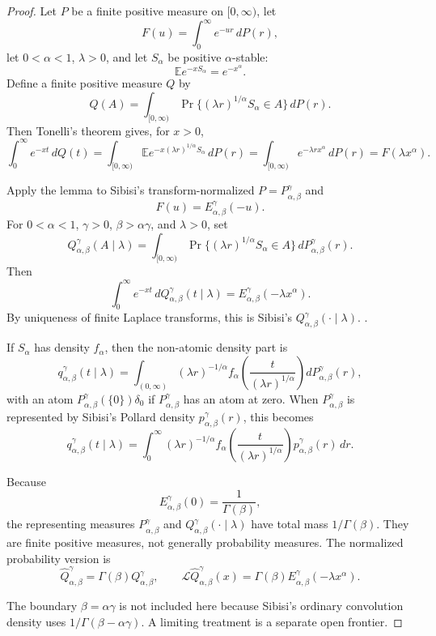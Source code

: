 \begin{proof}
Let \(P\) be a finite positive measure on \([0,\infty)\), let
\[
F(u)=\int_0^\infty e^{-ur}\,dP(r),
\]
let \(0<\alpha<1\), \(\lambda>0\), and let \(S_\alpha\) be positive \(\alpha\)-stable:
\[
\mathbb E e^{-xS_\alpha}=e^{-x^\alpha}.
\]
Define a finite positive measure \(Q\) by
\[
Q(A)=\int_{[0,\infty)}
\Pr\{(\lambda r)^{1/\alpha}S_\alpha\in A\}\,dP(r).
\]
Then Tonelli's theorem gives, for \(x>0\),
\[
\int_0^\infty e^{-xt}\,dQ(t)
=\int_{[0,\infty)}
\mathbb E e^{-x(\lambda r)^{1/\alpha}S_\alpha}\,dP(r)
=\int_{[0,\infty)}e^{-\lambda r x^\alpha}\,dP(r)
=F(\lambda x^\alpha).
\]

Apply the lemma to Sibisi's transform-normalized \(P=P^\gamma_{\alpha,\beta}\) and
\[
F(u)=E^\gamma_{\alpha,\beta}(-u).
\]
For \(0<\alpha<1\), \(\gamma>0\), \(\beta>\alpha\gamma\), and \(\lambda>0\), set
\[
Q^\gamma_{\alpha,\beta}(A\mid\lambda)
=\int_{[0,\infty)}
\Pr\{(\lambda r)^{1/\alpha}S_\alpha\in A\}\,
dP^\gamma_{\alpha,\beta}(r).
\]
Then
\[
\int_0^\infty e^{-xt}\,dQ^\gamma_{\alpha,\beta}(t\mid\lambda)
=E^\gamma_{\alpha,\beta}(-\lambda x^\alpha).
\]
By uniqueness of finite Laplace transforms, this is Sibisi's \(Q^\gamma_{\alpha,\beta}(\cdot\mid\lambda)\). \cite{sibisi-prabhakar}.

If \(S_\alpha\) has density \(f_\alpha\), then the non-atomic density part is
\[
q^\gamma_{\alpha,\beta}(t\mid\lambda)
=\int_{(0,\infty)}
(\lambda r)^{-1/\alpha}
f_\alpha\!\left(\frac{t}{(\lambda r)^{1/\alpha}}\right)
dP^\gamma_{\alpha,\beta}(r),
\]
with an atom \(P^\gamma_{\alpha,\beta}(\{0\})\delta_0\) if \(P^\gamma_{\alpha,\beta}\) has an atom at zero. When \(P^\gamma_{\alpha,\beta}\) is represented by Sibisi's Pollard density \(p^\gamma_{\alpha,\beta}(r)\), this becomes
\[
q^\gamma_{\alpha,\beta}(t\mid\lambda)
=\int_0^\infty
(\lambda r)^{-1/\alpha}
f_\alpha\!\left(\frac{t}{(\lambda r)^{1/\alpha}}\right)
p^\gamma_{\alpha,\beta}(r)\,dr.
\]

Because
\[
E^\gamma_{\alpha,\beta}(0)=\frac1{\Gamma(\beta)},
\]
the representing measures \(P^\gamma_{\alpha,\beta}\) and \(Q^\gamma_{\alpha,\beta}(\cdot\mid\lambda)\) have total mass \(1/\Gamma(\beta)\). They are finite positive measures, not generally probability measures. The normalized probability version is
\[
\widehat Q^\gamma_{\alpha,\beta}=\Gamma(\beta)Q^\gamma_{\alpha,\beta},
\qquad
\mathcal L\widehat Q^\gamma_{\alpha,\beta}(x)
=\Gamma(\beta)E^\gamma_{\alpha,\beta}(-\lambda x^\alpha).
\]

The boundary \(\beta=\alpha\gamma\) is not included here because Sibisi's ordinary convolution density uses \(1/\Gamma(\beta-\alpha\gamma)\). A limiting treatment is a separate open frontier.
\end{proof}

